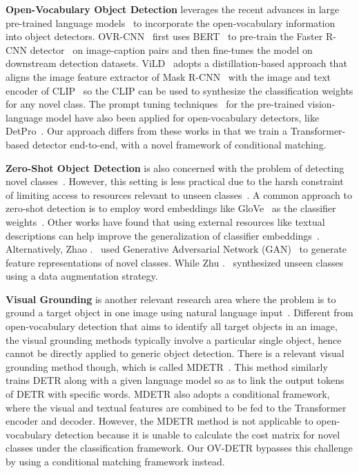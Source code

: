 \documentclass[runningheads]{llncs}
\begin{document}
\noindent \textbf{Open-Vocabulary Object Detection} leverages the recent advances in large pre-trained language models~\cite{zareian2021open,gu2021open} to incorporate the open-vocabulary information into object detectors. OVR-CNN~\cite{zareian2021open} first uses BERT~\cite{devlin2018bert} to pre-train the Faster R-CNN detector~\cite{ren2015faster} on image-caption pairs and then fine-tunes the model on downstream detection datasets. ViLD~\cite{gu2021open} adopts a distillation-based approach that aligns the image feature extractor of Mask R-CNN~\cite{he2017mask} with the image and text encoder of CLIP~\cite{radford2021learning} so the CLIP can be used to synthesize the classification weights for any novel class. 
The prompt tuning techniques~\cite{zhou2022coop,zhou2022cocoop,zhang2022neural} for the pre-trained vision-language model have also been applied for open-vocabulary detectors, like DetPro~\cite{du2022learning}.
Our approach differs from these works in that we train a Transformer-based detector end-to-end, with a novel framework of conditional matching.

\noindent \textbf{Zero-Shot Object Detection}
is also concerned with the problem of detecting novel classes~\cite{bansal2018zero,li2019zero,zhu2020don,rahman2021improved,zhao2020gtnet}. However, this setting is less practical due to the harsh constraint of limiting access to resources relevant to unseen classes~\cite{zareian2021open}. A common approach to zero-shot detection is to employ word embeddings like GloVe~\cite{pennington2014glove} as the classifier weights~\cite{bansal2018zero}. Other works have found that using external resources like textual descriptions can help improve the generalization of classifier embeddings~\cite{li2019zero,rahman2021improved}. Alternatively, Zhao \etal.~\cite{zhao2020gtnet} used Generative Adversarial Network (GAN)~\cite{goodfellow2014generative} to generate feature representations of novel classes. While Zhu \etal.~\cite{zhu2020don} synthesized unseen classes using a data augmentation strategy.

\noindent \textbf{Visual Grounding}
is another relevant research area where the problem is to ground a target object in one image using natural language input~\cite{deng2018visual,chen2017query}. Different from open-vocabulary detection that aims to identify all target objects in an image, the visual grounding methods typically involve a particular single object, hence cannot be directly applied to generic object detection. There is a relevant visual grounding method though, which is called MDETR~\cite{kamath2021mdetr}. This method similarly trains DETR along with a given language model so as to link the output tokens of DETR with specific words. MDETR also adopts a conditional framework, where the visual and textual features are combined to be fed to the Transformer encoder and decoder. However, the MDETR method is not applicable to open-vocabulary detection because it is unable to calculate the cost matrix for novel classes under the classification framework. Our OV-DETR bypasses this challenge by using a conditional matching framework instead.
\end{document}
